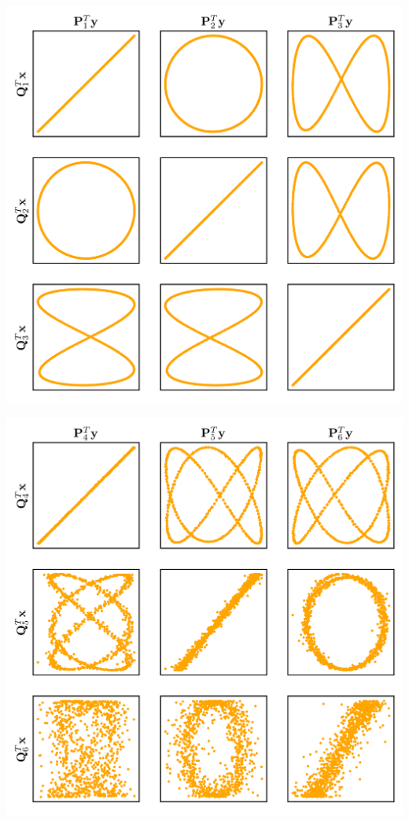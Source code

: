 \documentclass[aspectratio=169, usenames, dvipsnames]{beamer}
\begin{document}
{\begin{frame}
  \includegraphics[height=.95\textheight]{cylinder_cca_portraits}
  \vfill
\end{frame}


\begin{frame}
  \vfill
  \centering

  \includegraphics[height=.95\textheight]{cylinder_cca_portraits_bis}
  \vfill
\end{frame}

}
\end{document}
